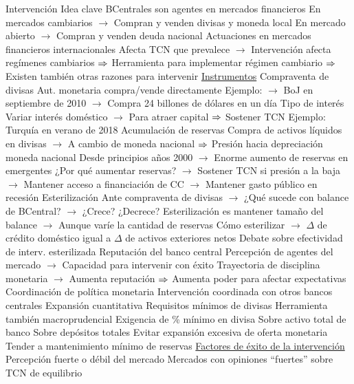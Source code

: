 \documentclass{nuevotema}
\begin{document}
\begin{esquemal}
		\2 Intervención
			\3 Idea clave
				\4 BCentrales son agentes en mercados financieros
				\4[] En mercados cambiarios
				\4[] $\to$ Compran y venden divisas y moneda local
				\4[] En mercado abierto
				\4[] $\to$ Compran y venden deuda nacional
				\4 Actuaciones en mercados financieros internacionales
				\4[] Afecta TCN que prevalece
				\4[] $\to$ Intervención afecta regímenes cambiarios
				\4[] $\Rightarrow$ Herramienta para implementar régimen cambiario
				\4[] $\Rightarrow$ Existen también otras razones para intervenir
			\3 \underline{Instrumentos}
			\3 Compraventa de divisas
				\4[] Aut. monetaria compra/vende directamente
				\4[] Ejemplo:
				\4[] $\to$ BoJ en septiembre de 2010
				\4[] $\to$ Compra 24 billones de dólares en un día
			\3 Tipo de interés
				\4[] Variar interés doméstico
				\4[] $\to$ Para atraer capital
				\4[] $\Rightarrow$ Sostener TCN
				\4[] Ejemplo: Turquía en verano de 2018
			\3 Acumulación de reservas
				\4[] Compra de activos líquidos en divisas
				\4[] $\to$ A cambio de moneda nacional
				\4[] $\Rightarrow$ Presión hacia depreciación moneda nacional
				\4[] Desde principios años 2000
				\4[] $\to$ Enorme aumento de reservas en emergentes
				\4[] ¿Por qué aumentar reservas?
				\4[] $\to$ Sostener TCN si presión a la baja
				\4[] $\to$ Mantener acceso a financiación de CC
				\4[] $\to$ Mantener gasto público en recesión
			\3 Esterilización
				\4[] Ante compraventa de divisas
				\4[] $\to$ ¿Qué sucede con balance de BCentral?
				\4[] $\to$ ¿Crece? ¿Decrece?
				\4[] Esterilización es mantener tamaño del balance
				\4[] $\to$ Aunque varíe la cantidad de reservas
				\4[] Cómo esterilizar
				\4[] $\to$ $\Delta$ de crédito doméstico igual a $\Delta$ de activos exteriores netos
				\4[] Debate sobre efectividad de interv. esterilizada
			\3 Reputación del banco central
				\4[] Percepción de agentes del mercado
				\4[] $\to$ Capacidad para intervenir con éxito
				\4[] Trayectoria de disciplina monetaria
				\4[] $\to$ Aumenta reputación
				\4[] $\Rightarrow$ Aumenta poder para afectar expectativas
			\3 Coordinación de política monetaria
				\4[] Intervención coordinada con otros bancos centrales
			\3 Expansión cuantitativa
			\3 Requisitos mínimos de divisas
				\4 Herramienta también macroprudencial
				\4 Exigencia de \% mínimo en divisa
				\4[] Sobre activo total de banco
				\4[] Sobre depósitos totales
				\4 Evitar expansión excesiva de oferta monetaria
				\4 Tender a mantenimiento mínimo de reservas
			\3 \underline{Factores de éxito de la intervención}
				\4[i] Percepción fuerte o débil del mercado
				\4[] Mercados con opiniones ``fuertes'' sobre TCN de equilibrio

\end{esquemal}
\end{document}
